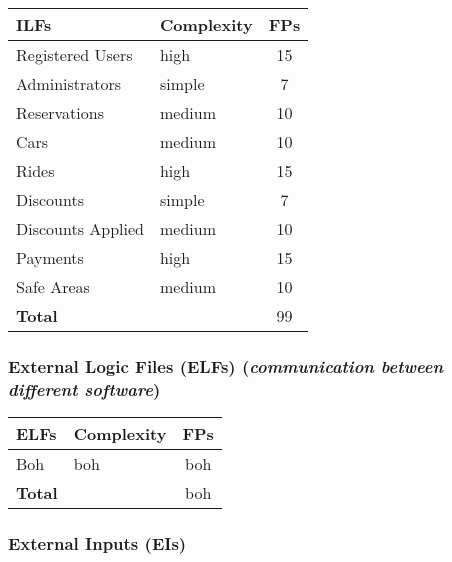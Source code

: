 \begin{center}
	\begin{tabular}{|l|l|c|}
		\hline
		\textbf{ILFs} 	& \textbf{Complexity} 	& \textbf{FPs} \\
		\hline
		Registered Users 	& high 	& 15 \\
		Administrators 	& simple 	& 7 \\
		Reservations 	& medium 	& 10 \\
		Cars 	& medium	& 10 \\
		Rides 	& high 	& 15 \\
		Discounts 	& simple 	& 7 \\
		Discounts Applied 	& medium 	& 10 \\
		Payments 	& high	& 15 \\
		Safe Areas  	& medium	& 10 \\
		\hline \hline
		\textbf{Total} 	& 	& 99 \\
		\hline
	\end{tabular}
\end{center}

\subsubsection{External Logic Files (ELFs) (\textit{communication between different software})}

	
\begin{center}
	\begin{tabular}{|l|l|c|}
		\hline
		\textbf{ELFs} 	& \textbf{Complexity} 	& \textbf{FPs} \\
		\hline
		Boh 	& boh 	& boh \\

		\hline \hline
		\textbf{Total} 	& 	& boh \\
		\hline
	\end{tabular}
\end{center}


\subsubsection{External Inputs (EIs)}

